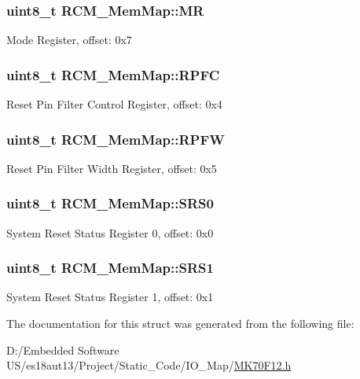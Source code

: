 \subsubsection[{M\+R}]{\setlength{\rightskip}{0pt plus 5cm}uint8\+\_\+t R\+C\+M\+\_\+\+Mem\+Map\+::\+M\+R}\label{struct_r_c_m___mem_map_a0e7b707ffc94ef2a3c49a5ca51acc6c9}
Mode Register, offset\+: 0x7 \hypertarget{struct_r_c_m___mem_map_ace89c039f8342f8b5dd26c3c7b8309a2}{}
\subsubsection[{R\+P\+F\+C}]{\setlength{\rightskip}{0pt plus 5cm}uint8\+\_\+t R\+C\+M\+\_\+\+Mem\+Map\+::\+R\+P\+F\+C}\label{struct_r_c_m___mem_map_ace89c039f8342f8b5dd26c3c7b8309a2}
Reset Pin Filter Control Register, offset\+: 0x4 \hypertarget{struct_r_c_m___mem_map_ac458f95f6aa234285f568694a5b8240d}{}
\subsubsection[{R\+P\+F\+W}]{\setlength{\rightskip}{0pt plus 5cm}uint8\+\_\+t R\+C\+M\+\_\+\+Mem\+Map\+::\+R\+P\+F\+W}\label{struct_r_c_m___mem_map_ac458f95f6aa234285f568694a5b8240d}
Reset Pin Filter Width Register, offset\+: 0x5 \hypertarget{struct_r_c_m___mem_map_aa28b91bdb2e1acc454f7bcb9ad26efb7}{}
\subsubsection[{S\+R\+S0}]{\setlength{\rightskip}{0pt plus 5cm}uint8\+\_\+t R\+C\+M\+\_\+\+Mem\+Map\+::\+S\+R\+S0}\label{struct_r_c_m___mem_map_aa28b91bdb2e1acc454f7bcb9ad26efb7}
System Reset Status Register 0, offset\+: 0x0 \hypertarget{struct_r_c_m___mem_map_a8e7926e6f51e64e63e5ed3adb7aee612}{}
\subsubsection[{S\+R\+S1}]{\setlength{\rightskip}{0pt plus 5cm}uint8\+\_\+t R\+C\+M\+\_\+\+Mem\+Map\+::\+S\+R\+S1}\label{struct_r_c_m___mem_map_a8e7926e6f51e64e63e5ed3adb7aee612}
System Reset Status Register 1, offset\+: 0x1 

The documentation for this struct was generated from the following file\+:\begin{DoxyCompactItemize}
\item 
D\+:/\+Embedded Software U\+S/es18aut13/\+Project/\+Static\+\_\+\+Code/\+I\+O\+\_\+\+Map/\hyperlink{_m_k70_f12_8h}{M\+K70\+F12.\+h}\end{DoxyCompactItemize}
